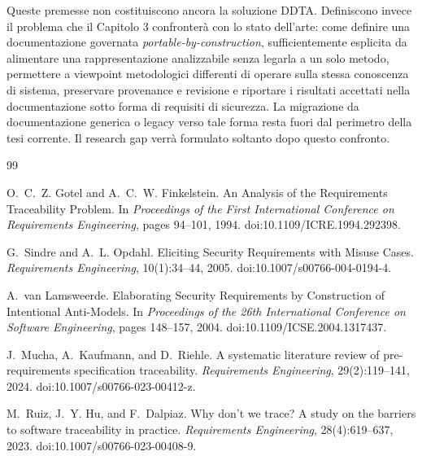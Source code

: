 \documentclass[12pt,a4paper,oneside]{report}
\begin{document}
Queste premesse non costituiscono ancora la soluzione DDTA. Definiscono invece il problema che il Capitolo 3 confronterà con lo stato dell'arte: come definire una documentazione governata \emph{portable-by-construction}, sufficientemente esplicita da alimentare una rappresentazione analizzabile senza legarla a un solo metodo, permettere a viewpoint metodologici differenti di operare sulla stessa conoscenza di sistema, preservare provenance e revisione e riportare i risultati accettati nella documentazione sotto forma di requisiti di sicurezza. La migrazione da documentazione generica o legacy verso tale forma resta fuori dal perimetro della tesi corrente. Il research gap verrà formulato soltanto dopo questo confronto.

\clearpage
\begin{thebibliography}{99}

O.~C.~Z. Gotel and A.~C.~W. Finkelstein.
\newblock An Analysis of the Requirements Traceability Problem.
\newblock In \emph{Proceedings of the First International Conference on Requirements Engineering}, pages 94--101, 1994.
\newblock doi:10.1109/ICRE.1994.292398.

G.~Sindre and A.~L. Opdahl.
\newblock Eliciting Security Requirements with Misuse Cases.
\newblock \emph{Requirements Engineering}, 10(1):34--44, 2005.
\newblock doi:10.1007/s00766-004-0194-4.

A.~van Lamsweerde.
\newblock Elaborating Security Requirements by Construction of Intentional Anti-Models.
\newblock In \emph{Proceedings of the 26th International Conference on Software Engineering}, pages 148--157, 2004.
\newblock doi:10.1109/ICSE.2004.1317437.

J.~Mucha, A.~Kaufmann, and D.~Riehle.
\newblock A systematic literature review of pre-requirements specification traceability.
\newblock \emph{Requirements Engineering}, 29(2):119--141, 2024.
\newblock doi:10.1007/s00766-023-00412-z.

M.~Ruiz, J.~Y. Hu, and F.~Dalpiaz.
\newblock Why don't we trace? A study on the barriers to software traceability in practice.
\newblock \emph{Requirements Engineering}, 28(4):619--637, 2023.
\newblock doi:10.1007/s00766-023-00408-9.


\end{thebibliography}
\end{document}
